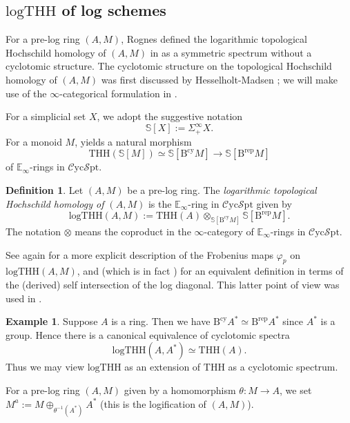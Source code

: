 \documentclass[11pt, a4paper]{amsart}
\theoremstyle{definition}
\newtheorem{df}[thm]{Definition}
\newtheorem{exm}[thm]{Example}
\numberwithin{equation}{subsection}
\newcommand{\E}{\mathbb{E}}
\newcommand{\THH}{\mathrm{THH}}
\newcommand{\Brep}{\operatorname{B^{rep}}}
\newcommand{\Bcy}{\operatorname{B^{cy}}}
\newcommand{\Sphere}{\mathbb{S}}
\newcommand{\logTHH}{\mathrm{logTHH}}
\newcommand{\infCycSpt}{\mathcal{C}\mathrm{yc}\mathcal{S}\mathrm{pt}}
\newcommand{\Einfty}{{\mathbb{E}_\infty}}
\begin{document}
\subsection{\texorpdfstring{$\logTHH$}{logTHH} of log schemes}
For a pre-log ring $(A,M)$, 
Rognes defined the logarithmic topological Hochschild homology of $(A,M)$ in \cite[Definition 8.11]{RognesLogHH} 
as a symmetric spectrum without a cyclotomic structure.
The cyclotomic structure on the topological Hochschild homology of $(A,M)$ was first discussed by 
Hesselholt-Madsen \cite{zbMATH00938856};
we will make use of the $\infty$-categorical formulation in \cite{zbMATH07063999}.


For a simplicial set $X$, we adopt the suggestive notation
\[
\Sphere[X]
:=
\Sigma_+^\infty X.
\]
For a monoid $M$,
\cite[Construction 3.7]{BLPO} yields a natural morphism
\[
\THH(\Sphere[M])
\simeq
\Sphere[\Bcy M]
\to
\Sphere[\Brep M]
\]
of $\E_\infty$-rings in $\infCycSpt$.



\begin{df}
\label{Hoch.6}
Let $(A,M)$ be a pre-log ring.
The \emph{logarithmic topological Hochschild homology of $(A,M)$}
\index[notation]{logTHH @ $\logTHH$} 
is the $\Einfty$-ring in $\infCycSpt$ given by
\begin{equation}
\label{Hoch.6.2}
\logTHH(A,M)
:=
\THH(A)\otimes_{\Sphere[\Bcy M]} \Sphere[\Brep M].
\end{equation}
The notation $\otimes$ means the coproduct in the $\infty$-category of $\E_\infty$-rings in $\infCycSpt$.
\end{df}

See again \cite[Construction 3.7, Definition 3.8]{BLPO2} for a more explicit description of the Frobenius maps $\varphi_p$ on $\logTHH(A,M)$, and \cite[Proposition 3.6]{BLPO2} (which is in fact \cite[Proposition 5.8]{lundemo}) for an equivalent definition in terms of the (derived) self intersection of the log diagonal. This latter point of view was used in \cite{BLPO}.


\begin{exm}
\label{Hoch.36}
Suppose $A$ is a ring.
Then we have $\Bcy A^*\simeq \Brep A^*$ since $A^*$ is a group.
Hence there is a canonical equivalence of cyclotomic spectra
\[
\logTHH(A,A^*)
\simeq
\THH(A).
\]
Thus we may view $\logTHH$ as an extension of $\THH$ as a cyclotomic spectrum.
\end{exm}

For a pre-log ring $(A,M)$ given by a homomorphism $\theta\colon M\to A$,
we set $M^a:=M\oplus_{\theta^{-1}(A^*)}A^*$ (this is the logification of $(A,M)$).
\end{document}
